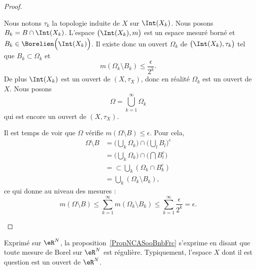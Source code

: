 \begin{proof}
\begin{subproof}
        Nous notons \( \tau_k\) la topologie induite de \( X\) sur \( \Int(X_k)\). Nous posons \( B_k=B\cap\Int(X_k)\). L'espace \( \big( \Int(X_k),m \big)\) est un espace mesuré borné et \( B_k\in \Borelien\Big( \Int(X_k) \Big)\). Il existe donc un ouvert \( \Omega_k\) de \( \big( \Int(X_k),\tau_k \big)\) tel que \( B_k\subset \Omega_k\) et
        \begin{equation}
            m(\Omega_k\setminus B_k)\leq \frac{ \epsilon }{ 2^k }.
        \end{equation}
        De plus \( \Int(X_k)\) est un ouvert de \( (X,\tau_X)\), donc en réalité \( \Omega_k\) est un ouvert de \( X\). Nous posons
        \begin{equation}
            \Omega=\bigcup_{k=1}^{\infty}\Omega_k
        \end{equation}
        qui est encore un ouvert de \( (X,\tau_X)\).

        Il est temps de voir que \( \Omega\) vérifie \( m(\Omega\setminus B)\leq \epsilon\). Pour cela,
        \begin{subequations}
            \begin{align}
          \Omega\setminus B & =\big( \bigcup_k\Omega_k \big)\cap\big( \bigcup_lB_l \big)^c    \\
                            & =\big( \bigcup_k\Omega_k \big)\cap\big( \bigcap B_l^c \big)     \\
                            & =\subset\bigcup_k(\Omega_k\cap B_k^c)\\
                            & =\bigcup_k(\Omega_k\setminus B_k),
            \end{align}
        \end{subequations}
        ce qui donne au niveau des mesures :
        \begin{equation}
            m(\Omega\setminus B)\leq\sum_{k=1}^{\infty}m(\Omega_k\setminus B_k)\leq\sum_{k=1}^{\infty}\frac{ \epsilon }{ 2^k }=\epsilon.
        \end{equation}
    \end{subproof}
\end{proof}

\begin{remark}      \label{RemooOAGCooRHpjxd}
    Exprimé sur \( \eR^N\), la proposition~\ref{PropNCASooBnbFrc} s'exprime en disant que toute mesure de Borel sur \( \eR^N\) est régulière. Typiquement, l'espace \( X\) dont il est question est un ouvert de \( \eR^N\).
\end{remark}

